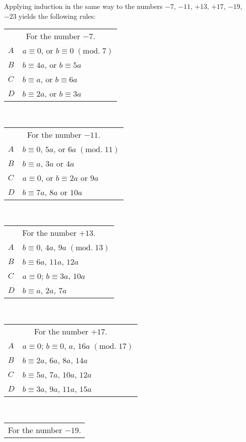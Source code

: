\documentclass[twoside,12pt]{memoir}
\renewcommand{\pmod}[1]{\;(\textrm{mod.}\;#1)}
\begin{document}
Applying induction in the same way to the numbers \(-7\), \(-11\), \(+13\), \(+17\), \(-19\), \(-23\) yields the following rules:
\begin{center}
\begin{tabular}{l|l}
\multicolumn{2}{c}{For the number \(-7\).}\\
\(A\) & \(a \equiv 0\), or \(b \equiv 0\pmod{7}\) \\
\(B\) & \(b \equiv 4 a\), or \(b \equiv 5 a\) \\
\(C\) & \(b \equiv a\), or \(b \equiv 6 a\) \\
\(D\) & \(b \equiv 2 a\), or \(b \equiv 3 a\) 
\end{tabular}\\
\begin{tabular}{l|l}
\multicolumn{2}{c}{For the number \(-11\).}\\
\(A\) & \(b \equiv 0\), \(5 a\), or \(6 a\pmod{11}\) \\
\(B\) & \(b \equiv a\), \(3 a\) or \(4 a\) \\
\(C\) & \(a \equiv 0\), or \(b \equiv 2 a\) or \(9 a\) \\
\(D\) & \(b \equiv 7 a\), \(8 a\) or \(10 a\)
\end{tabular}\\
\begin{tabular}{l|l}
\multicolumn{2}{c}{For the number \(+13\).}\\
\(A\) & \(b \equiv 0\), \(4a\), \(9 a\pmod{13}\) \\
\(B\) & \(b \equiv 6 a\), \(11 a\), \(12 a\) \\
\(C\) & \(a \equiv 0\); \(b \equiv 3 a\), \(10 a\) \\
\(D\) & \(b \equiv a\), \(2 a\), \(7 a\)
\end{tabular}\\
\begin{tabular}{l|l}
\multicolumn{2}{c}{For the number \(+17\).}\\
\(A\) & \(a \equiv 0\); \(b \equiv 0\), \(a\), \(16 a\pmod{17}\)\\
\(B\) & \(b \equiv 2 a\), \(6 a\), \(8 a\), \(14 a\)\\
\(C\) & \(b \equiv 5 a\), \(7 a\), \(10 a\), \(12 a\)\\
\(D\) & \(b \equiv 3 a\), \(9 a\), \(11 a\), \(15 a\)
\end{tabular}\\
\begin{tabular}{l|l}
\multicolumn{2}{c}{For the number \(-19\).}\\

\end{tabular}
\end{center}
\end{document}
